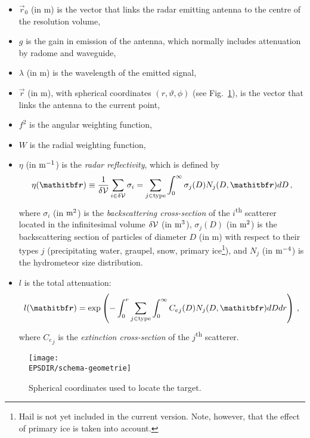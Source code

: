 \begin{itemize}
\item $\vec r_0$ (in m) is the vector that links the radar emitting antenna to the centre of the resolution volume, 
\item $g$ is the gain in emission of the antenna, which normally includes attenuation by radome and waveguide, 
\item $\lambda$ (in m) is the wavelength of the emitted signal, 
\item $\vec r$ (in m), with spherical coordinates $(r,\vartheta,\phi)$ (see Fig.~\ref{coord-spher}), is the vector that links the antenna to the current point, 
\item $f^2$ is the angular weighting function,
\item $W$ is the radial weighting function, 
\item $\eta$ (in $\rm m^{-1}$) is the \emph{radar reflectivity}, which is defined by
\begin{equation}
\eta(\vec r)\equiv\frac1{\delta\cal V}\sum_{i\in\delta\cal V}\sigma_i=\sum_{j\in\rm type}\int_0^\infty\sigma_j(D)N_j(D,\vec r)d D\,,\label{eta}
\end{equation}
where $\sigma_i$ (in $\rm m^2$) is the \emph{backscattering cross-section} of the $i$\textsuperscript{th} scatterer located in the infinitesimal volume $\delta\cal V$ (in $\rm m^3$), $\sigma_j(D)$ (in $\rm m^2$) is the backscattering section of particles of diameter $D$ (in m) with respect to their types $j$ (precipitating water, graupel, snow, primary ice\footnote{Hail is not yet included in the current version. Note, however, that the effect of primary ice is taken into account.}), and $N_j$ (in $\rm m^{-4}$) is the hydrometeor size distribution. %
\item $l$ is the total attenuation:
\begin{equation}
l({\vec r})=\exp\left(-\int_0^r\sum_{j\in\rm type}\int_0^\infty {C_e}_j(D)N_j(D,{\vec r})d Dd r\right)\,,\label{l}
\end{equation}
where ${C_e}_j$ is the \emph{extinction cross-section} of the $j$\textsuperscript{th} scatterer.
\end{itemize}

 \begin{figure}
 \centering
\texttt{[image: \\EPSDIR/schema-geometrie]}
 \caption{Spherical coordinates used to locate the target.}\label{coord-spher}
 \end{figure}

